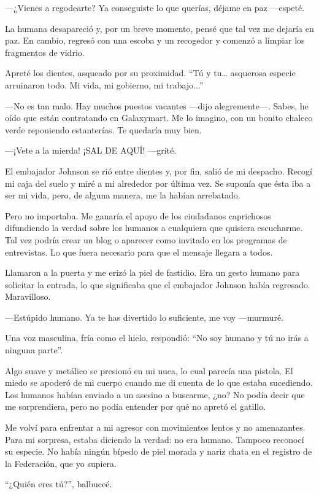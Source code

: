 —¿Vienes a regodearte? Ya conseguiste lo que querías, déjame en paz —espeté.

La humana desapareció y, por un breve momento, pensé que tal vez me dejaría en paz. En cambio, regresó con una escoba y un recogedor y comenzó a limpiar los fragmentos de vidrio.

Apreté los dientes, asqueado por su proximidad. ``Tú y tu… asquerosa especie arruinaron todo. Mi vida, mi gobierno, mi trabajo...''


—No es tan malo. Hay muchos puestos vacantes —dijo alegremente—. Sabes, he oído que están contratando en Galaxymart. Me lo imagino, con un bonito chaleco verde reponiendo estanterías. Te quedaría muy bien.

—¡Vete a la mierda! ¡SAL DE AQUÍ! —grité.

El embajador Johnson se rió entre dientes y, por fin, salió de mi despacho. Recogí mi caja del suelo y miré a mi alrededor por última vez. Se suponía que ésta iba a ser mi vida, pero, de alguna manera, me la habían arrebatado.

Pero no importaba. Me ganaría el apoyo de los ciudadanos caprichosos difundiendo la verdad sobre los humanos a cualquiera que quisiera escucharme. Tal vez podría crear un blog o aparecer como invitado en los programas de entrevistas. Lo que fuera necesario para que el mensaje llegara a todos.

Llamaron a la puerta y me erizó la piel de fastidio. Era un gesto humano para solicitar la entrada, lo que significaba que el embajador Johnson había regresado. Maravilloso.

—Estúpido humano. Ya te has divertido lo suficiente, me voy —murmuré.

Una voz masculina, fría como el hielo, respondió: ``No soy humano y tú no irás a ninguna parte''.

Algo suave y metálico se presionó en mi nuca, lo cual parecía una pistola. El miedo se apoderó de mi cuerpo cuando me di cuenta de lo que estaba sucediendo. Los humanos habían enviado a un asesino a buscarme, ¿no? No podía decir que me sorprendiera, pero no podía entender por qué no apretó el gatillo.

Me volví para enfrentar a mi agresor con movimientos lentos y no amenazantes. Para mi sorpresa, estaba diciendo la verdad: no era humano. Tampoco reconocí su especie. No había ningún bípedo de piel morada y nariz chata en el registro de la Federación, que yo supiera.

``¿Quién eres tú?'', balbuceé.

